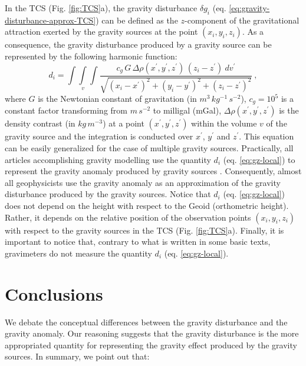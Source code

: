 \documentclass[extra]{gji}
\begin{document}
In the TCS (Fig. \ref{fig:TCS}a),
the gravity disturbance $\delta g_{i}$ (eq. \ref{eq:gravity-disturbance-approx-TCS})
can be defined as the $z$-component of the gravitational attraction exerted by
the gravity sources at the point $(x_{i}, y_{i}, z_{i})$.
As a consequence, the gravity disturbance produced by
a gravity source can be represented by the following harmonic function:
\begin{equation}
d_{i} = \int\int\limits_{v}\int 
\frac{c_{g} \, G \, \Delta\rho(x^{\prime}, y^{\prime}, z^{\prime}) 
\, (z_{i} - z^{\prime}) \: dv^{\prime}}
{\sqrt{(x_{i} - x^{\prime})^{2} + 
(y_{i} - y^{\prime})^{2} + (z_{i} - z^{\prime})^{2}}} \: ,
\label{eq:gz-local}
\end{equation}
where $G$ is the Newtonian constant of gravitation (in $m^{3} \, kg^{-1} \, s^{-2}$),
$c_{g} = 10^{5}$ is a constant factor transforming from $m \, s^{-2}$ 
to milligal (mGal), $\Delta\rho(x^{\prime}, y^{\prime}, z^{\prime})$
is the density contrast (in $kg \, m^{-3}$) at a point 
$(x^{\prime}, y^{\prime}, z^{\prime})$ within 
the volume $v$ of the gravity source and the integration is conducted 
over $x^{\prime}$, $y^{\prime}$ and $z^{\prime}$.
This equation can be easily generalized for the case
of multiple gravity sources.
Practically, all articles accomplishing gravity modelling
use the quantity $d_{i}$ (eq. \ref{eq:gz-local})
to represent the gravity anomaly produced by 
gravity sources \citep[e.g.,][]{blakely1996}. 
Consequently, almost all geophysicists use the gravity
anomaly as an approximation of the gravity disturbance
produced by the gravity sources. Notice that $d_{i}$ 
(eq. \ref{eq:gz-local}) does not depend on the
height with respect to the Geoid (orthometric height). 
Rather, it depends on the relative position 
of the observation points $(x_{i}, y_{i}, z_{i})$ with respect to
the gravity sources in the TCS (Fig. \ref{fig:TCS}a).
Finally, it is important to notice that, contrary to what 
is written in some basic texts, gravimeters do not measure 
the quantity $d_{i}$ (eq. \ref{eq:gz-local}).


\section{Conclusions}

We debate the conceptual differences between the gravity
disturbance and the gravity anomaly.
Our reasoning suggests that the gravity disturbance is the
more appropriated quantity for representing the gravity
effect produced by the gravity sources.
In summary, we point out that:
\end{document}
